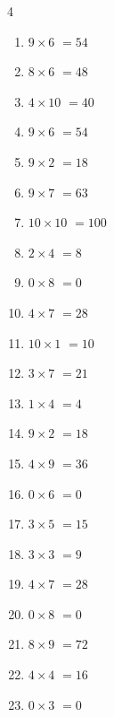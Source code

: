 \begin{multicols}{4}
\begin{enumerate}
  \item $9\times 6$
        $=54$

  \item $8\times 6$
        $=48$

  \item $4\times 10$
        $=40$

  \item $9\times 6$
        $=54$

  \item $9\times 2$
        $=18$

  \item $9\times 7$
        $=63$

  \item $10\times 10$
        $=100$

\columnbreak %

  \item $2\times 4$
        $=8$

  \item $0\times 8$
        $=0$

  \item $4\times 7$
        $=28$

  \item $10\times 1$
        $=10$

  \item $3\times 7$
        $=21$

  \item $1\times 4$
        $=4$

  \item $9\times 2$
        $=18$

  \item $4\times 9$
        $=36$

  \item $0\times 6$
        $=0$

  \item $3\times 5$
        $=15$

  \item $3\times 3$
        $=9$

  \item $4\times 7$
        $=28$

  \item $0\times 8$
        $=0$

  \item $8\times 9$
        $=72$

  \item $4\times 4$
        $=16$

  \item $0\times 3$
        $=0$


\end{enumerate}
\end{multicols}
